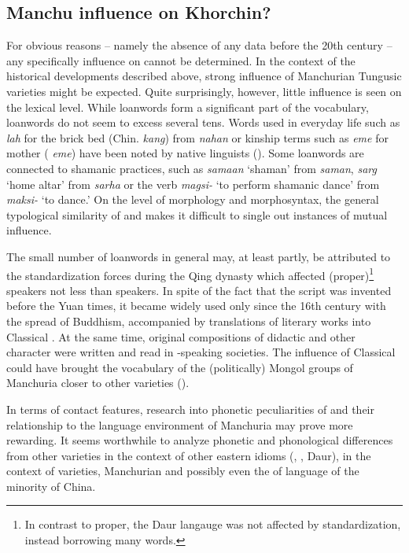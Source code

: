\documentclass[output=paper,colorlinks,citecolor=brown]{langscibook}
\begin{document}
\subsection{Manchu influence on Khorchin?}

For obvious reasons – namely the absence of any  data before the 20th century – any specifically  influence on  cannot be determined. In the context of the historical developments described above, strong influence of Manchurian Tungusic varieties might be expected. Quite surprisingly, however, little influence is seen on the lexical level. While  loanwords form a significant part of the  vocabulary,  loanwords do not seem to excess several tens. Words used in everyday life such as \textit{lah} for the brick bed (Chin. \textit{kang}) from  \textit{nahan} or kinship terms such as \textit{eme} for mother ( \textit{eme}) have been noted by native linguists (\citealt[25]{Bayančoγtu2002}). Some  loanwords are connected to shamanic practices, such as \textit{samaan} ‘shaman’ from  \textit{saman}, \textit{sarg} ‘home altar’ from  \textit{sarha} or the verb \textit{magsi-} ‘to perform shamanic dance’ from  \textit{maksi-} ‘to dance.’ On the level of morphology and morphosyntax, the general typological similarity of  and  makes it difficult to single out instances of mutual influence. 

The small number of  loanwords in general may, at least partly, be attributed to the standardization forces during the Qing dynasty which affected  (proper)\footnote{In contrast to  proper, the  Daur langauge was not affected by standardization, instead borrowing many  words.} speakers not less than  speakers. In spite of the fact that the  script was invented before the Yuan times, it became widely used only since the 16th century with the spread of Buddhism, accompanied by translations of literary works into Classical . At the same time, original compositions of didactic and other character were written and read in -speaking societies. The influence of Classical  could have brought the vocabulary of the (politically) Mongol groups of Manchuria closer to other  varieties (\citealt[83]{Crossley2006}).

In terms of contact features, research into phonetic peculiarities of  and their relationship to the language environment of Manchuria may prove more rewarding. It seems worthwhile to analyze  phonetic and phonological differences from other  varieties in the context of other eastern  idioms (, , Daur), in the context of  varieties, Manchurian  and possibly even the of language of the  minority of China. 
\end{document}
